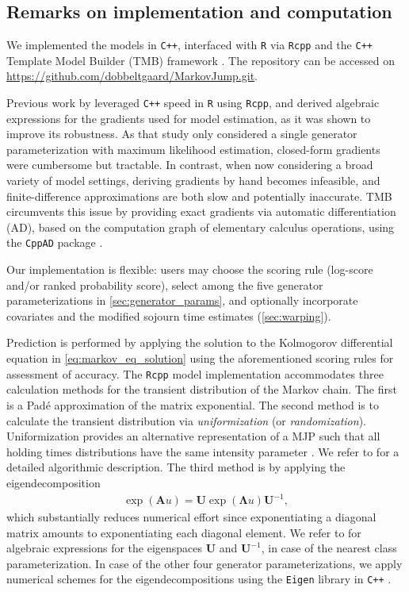 \subsection{Remarks on implementation and computation} \label{sec:computation_remarks}
We implemented the models in \texttt{C++}, interfaced with \texttt{R} via \texttt{Rcpp} \citep{Rcpp} and the \texttt{C++} Template Model Builder (TMB) framework \citep{TMB}.
The repository can be accessed on \url{https://github.com/dobbeltgaard/MarkovJump.git}.
 
Previous work by \citet{bisgaard2024A} leveraged \texttt{C++} speed in \texttt{R} using \texttt{Rcpp}, and derived algebraic expressions for the gradients used for model estimation, as it was shown to improve its robustness. 
As that study only considered a single generator parameterization with maximum likelihood estimation, closed-form gradients were cumbersome but tractable.
In contrast, when now considering a broad variety of model settings, deriving gradients by hand becomes infeasible, and finite-difference approximations are both slow and potentially inaccurate. TMB circumvents this issue by providing exact gradients via automatic differentiation (AD), based on the computation graph of elementary calculus operations, using the \texttt{CppAD} package \citep{CppAD}.

Our implementation is flexible: users may choose the scoring rule (log-score and/or ranked probability score), select among the five generator parameterizations in \cref{sec:generator_params}, and optionally incorporate covariates and the modified sojourn time estimates (\cref{sec:warping}).
 
Prediction is performed by applying the solution to the Kolmogorov differential equation in \cref{eq:markov_eq_solution} using the aforementioned scoring rules for assessment of accuracy.
The \texttt{Rcpp} model implementation accommodates three calculation methods for the transient distribution of the Markov chain. The first is a Padé approximation of the matrix exponential. The second method is to calculate the transient distribution via \textit{uniformization} (or \textit{randomization}). Uniformization provides an alternative representation of a MJP such that all holding times distributions have the same intensity parameter \citep[Section 1.3.4]{bladt_nielsen}. We refer to \citet{sherlock2021a} for a detailed algorithmic description. The third method is by applying the eigendecomposition
\begin{align*}
    \exp{\left( \bm{A}u \right) } = \bm{U}  \exp{\left( \bm{\Lambda}u \right) } \bm{U}^{-1}, 
\end{align*}
which substantially reduces numerical effort since exponentiating a diagonal matrix amounts to exponentiating each diagonal element.
We refer to \citet{bisgaard2024A} for algebraic expressions for the eigenspaces $\bm{U}$ and $\bm{U}^{-1}$, in case of the nearest class parameterization. In case of the other four generator parameterizations, we apply numerical schemes for the eigendecompositions using the \texttt{Eigen} library in \texttt{C++} \citep{eigenweb}.

